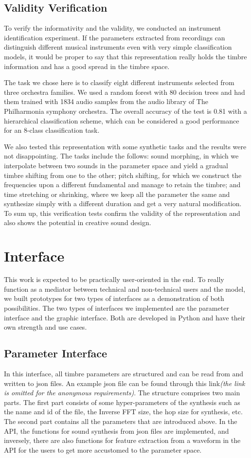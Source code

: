 \documentclass{article}
\begin{document}
\subsection{Validity Verification}
To verify the informativity and the validity, we conducted an instrument identification experiment. If the parameters extracted from recordings can distinguish different musical instruments even with very simple classification models, it would be proper to say that this representation really holds the timbre information and has a good spread in the timbre space.

The task we chose here is to classify eight different instruments selected from three orchestra families. We used a random forest with 80 decision trees and had them trained with 1834 audio samples from the audio library of The Philharmonia symphony orchestra\cite{Phiharmonia}. The overall accuracy of the test is 0.81 with a hierarchical classification scheme, which can be considered a good performance for an 8-class classification task. 

We also tested this representation with some synthetic tasks and the results were not disappointing. The tasks include the follows: sound morphing, in which we interpolate between two sounds in the parameter space and yield a gradual timbre shifting from one to the other; pitch shifting, for which we construct the frequencies upon a different fundamental and manage to retain the timbre; and time stretching or shrinking, where we keep all the parameter the same and synthesize simply with a different duration and get a very natural modification. To sum up, this verification tests confirm the validity of the representation and also shows the potential in creative sound design. 

\section{Interface}
This work is expected to be practically user-oriented in the end. To really function as a mediator between technical and non-technical users and the model, we built prototypes for two types of interfaces as a demonstration of both possibilities. The two types of interfaces we implemented are the parameter interface and the graphic interface. Both are developed in Python and have their own strength and use cases.

\subsection{Parameter Interface}
In this interface, all timbre parameters are structured and can be read from and written to json files. An example json file can be found through this link\emph{(the link is omitted for the anonymous requirements)}. The structure comprises two main parts. The first part consists of some hyper-parameters of the synthesis such as the name and id of the file, the Inverse FFT size, the hop size for synthesis, etc. The second part contains all the parameters that are introduced above. In the API, the functions for sound synthesis from json files are implemented, and inversely, there are also functions for feature extraction from a waveform in the API for the users to get more accustomed to the parameter space.
\end{document}
